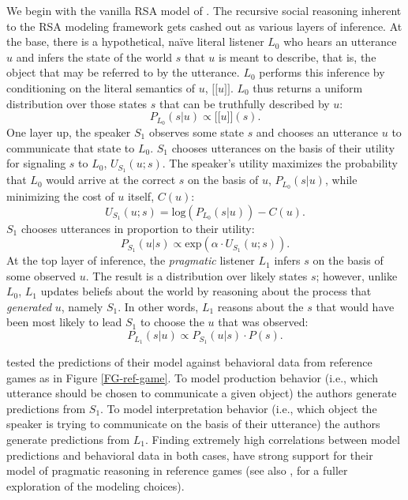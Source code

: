 \documentclass[10pt,a4paper]{article}
\newcommand{\sem}[1]{\mbox{$[\![$#1$]\!]$}}
\begin{document}
We begin with the vanilla RSA model of . The recursive social reasoning inherent to the RSA modeling framework gets cashed out as various layers of inference. At the base, there is a hypothetical, na\"ive literal listener $L_0$ who hears an utterance $u$ and infers the state of the world $s$ that $u$ is meant to describe, that is, the object that may be referred to by the utterance. $L_0$ performs this inference by conditioning on the literal semantics of $u$, \sem{$u$}. $L_0$ thus returns a uniform distribution over those states $s$ that can be truthfully described by $u$:
$$P_{L_{0}}(s|u) \propto \sem{$u$}(s).$$
One layer up, the speaker $S_1$ observes some state $s$ and chooses an utterance $u$ to communicate that state to $L_0$. $S_1$ chooses utterances on the basis of their utility for signaling $s$ to $L_0$, $U_{S_1}(u;s)$. The speaker's utility maximizes the probability that $L_0$ would arrive at the correct $s$ on the basis of $u$, $P_{L_{0}}(s|u)$, while minimizing the cost of $u$ itself, $C(u)$:
$$U_{S_{1}}(u;s) = \textrm{log}(P_{L_{0}}(s|u)) - C(u).$$
$S_1$ chooses utterances in proportion to their utility:
$$P_{S_{1}} (u|s) \propto   \textrm{exp}(\alpha \cdot U_{S_{1}} (u;s)).$$
At the top layer of inference, the \emph{pragmatic} listener $L_1$ infers $s$ on the basis of some observed $u$. The result is a distribution over likely states $s$; however, unlike $L_0$, $L_1$ updates beliefs about the world by reasoning about the process that \emph{generated} $u$, namely $S_1$. In other words, $L_1$ reasons about the $s$ that would have been most likely to lead $S_1$ to choose the $u$ that was observed:
$$P_{L_{1}}(s|u) \propto P_{S_{1}}(u|s) \cdot P(s).$$

 tested the predictions of their model against behavioral data from reference games as in Figure \ref{FG-ref-game}. To model production behavior (i.e., which utterance should be chosen to communicate a given object) the authors generate predictions from $S_1$. To model interpretation behavior (i.e., which object the speaker is trying to communicate on the basis of their utterance) the authors generate predictions from $L_1$. Finding extremely high correlations between model predictions and behavioral data in both cases, \citeauthor{frankgoodman2012} have strong support for their model of pragmatic reasoning in reference games (see also , for a fuller exploration of the modeling choices).
\end{document}
